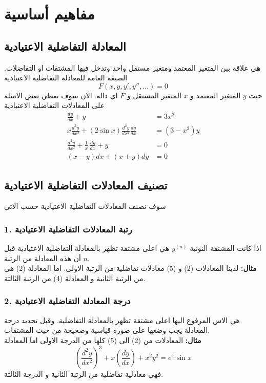 \chapter{مفاهيم أساسية}

\section[المعادلة التفاضلية الاعتيادية]{المعادلة التفاضلية الاعتيادية \cite{ode}}
هي علاقة بين المتغير المعتمد ومتغير مستقل واحد وتدخل فيها المشتقات او التفاضلات. الصيغة العامة للمعادلة التفاضلية الاعتيادية
\begin{equation}
	F(x, y, y', y'', \dots) = 0
\end{equation}
حيث $y$ المتغير المعتمد و $x$ المتغير المستقل و $F$ اي دالة. الان سوف نعطي بعض الامثلة على المعادلات التفاضلية الاعتيادية
\begin{align}
	\frac{dy}{dx} + y &= 3x^2\\[5pt]
	x\frac{d^3 y}{dx^3} + (2\sin x)\frac{d^2 y}{dx^2}\frac{dy}{dx} &= (3-x^2)y\\[5pt]
	\frac{d^2 y}{dx^2} + \frac{1}{x}\, \frac{dy}{dx} + y &=0 \\[5pt]
	(x-y)dx + (x+y)dy &= 0
\end{align}

\section[تصنيف المعادلات التفاضلية الاعتيادية]{تصنيف المعادلات التفاضلية الاعتيادية \cite{ode}}

سوف نصنف المعادلات التفاضلية الاعتيادية حسب الاتي
\subsection*{1. رتبة المعادلات التفاضلية الاعتيادية}
اذا كانت المشتقة النونية $y^{(n)}$ هي اعلى مشتقة تظهر بالمعادلة التفاضلية الاعتيادية قيل أن هذه المعادلة من الرتبة $n$.\\
\textbf{مثال:} لدينا المعادلات (2) و (5) معادلات تفاضلية من الرتبة الاولى. اما المعادلة (2) هي من الرتبة الثانية و المعادلة (4) من الرتبة الثالثة.

\subsection*{2. درجة المعادلة التفاضلية الاعتيادية}
هي الاس المرفوع اليها اعلى مشتقة تظهر بالمعادلة التفاضلية. وقبل تحديد درجة المعادلة يجب وضعها على صورة قياسية وصحيحة من حيث المشتقات.\\
\textbf{مثال:} المعادلات من (2) الى (5) كلها من الدرجة الاولى اما المعادلة
\begin{equation}
	\left(\frac{d^2 y}{dx^2}\right)^3 + x\left(\frac{dy}{dx}\right) + x^2 y^2 = e^x \sin x
\end{equation}
فهي معادلية تفاضلية من الرتبة الثانية و الدرجة الثالثة.


